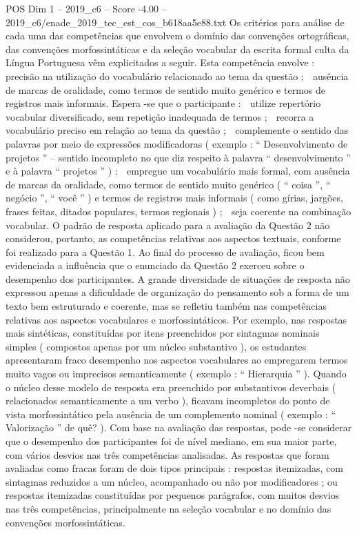 \begin{textsample}{POS Dim 1 – 2019\_c6 – Score -4.00 – 2019\_c6/enade\_2019\_tec\_est\_cos\_b618aa5e88.txt}
Os critérios para análise de cada uma das competências que envolvem o domínio das convenções ortográficas, das convenções morfossintáticas e da seleção vocabular da escrita formal culta da Língua Portuguesa vêm explicitados a seguir.
Esta competência envolve :  precisão na utilização do vocabulário relacionado ao tema da questão ;  ausência de marcas de oralidade, como termos de sentido muito genérico e termos de registros mais informais.
Espera -se que o participante :  utilize repertório vocabular diversificado, sem repetição inadequada de termos ;  recorra a vocabulário preciso em relação ao tema da questão ;  complemente o sentido das palavras por meio de expressões modificadoras ( exemplo : “ Desenvolvimento de projetos ” – sentido incompleto no que diz respeito à palavra “ desenvolvimento ” e à palavra “ projetos ” ) ;  empregue um vocabulário mais formal, com ausência de marcas da oralidade, como termos de sentido muito genérico ( “ coisa ”, “ negócio ”, “ você ” ) e termos de registros mais informais ( como gírias, jargões, frases feitas, ditados populares, termos regionais ) ;  seja coerente na combinação vocabular.
O padrão de resposta aplicado para a avaliação da Questão 2 não considerou, portanto, as competências relativas aos aspectos textuais, conforme foi realizado para a Questão 1.
Ao final do processo de avaliação, ficou bem evidenciada a influência que o enunciado da Questão 2 exerceu sobre o desempenho dos participantes.
A grande diversidade de situações de resposta não expressou apenas a dificuldade de organização do pensamento sob a forma de um texto bem estruturado e coerente, mas se refletiu também nas competências relativas aos aspectos vocabulares e morfossintáticos.
Por exemplo, nas respostas mais sintéticas, constituídas por itens preenchidos por sintagmas nominais simples ( compostos apenas por um núcleo substantivo ), os estudantes apresentaram fraco desempenho nos aspectos vocabulares ao empregarem termos muito vagos ou imprecisos semanticamente ( exemplo : “ Hierarquia ” ).
Quando o núcleo desse modelo de resposta era preenchido por substantivos deverbais ( relacionados semanticamente a um verbo ), ficavam incompletos do ponto de vista morfossintático pela ausência de um complemento nominal ( exemplo : “ Valorização ” de quê? ).
Com base na avaliação das respostas, pode -se considerar que o desempenho dos participantes foi de nível mediano, em sua maior parte, com vários desvios nas três competências analisadas.
As respostas que foram avaliadas como fracas foram de dois tipos principais : respostas itemizadas, com sintagmas reduzidos a um núcleo, acompanhado ou não por modificadores ; ou respostas itemizadas constituídas por pequenos parágrafos, com muitos desvios nas três competências, principalmente na seleção vocabular e no domínio das convenções morfossintáticas.

\end{textsample}

